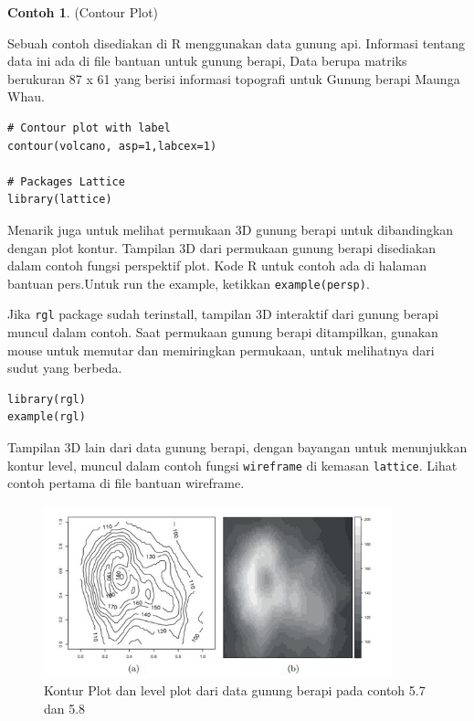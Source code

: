 \documentclass[a4paper,12pt]{article}
\theoremstyle{definition}
\newtheorem{example}{Contoh}[section]
\begin{document}
\begin{example}(Contour Plot)

Sebuah contoh disediakan di R menggunakan data gunung api. Informasi tentang data ini ada di file bantuan untuk gunung berapi, Data berupa matriks berukuran 87 x 61 yang berisi informasi topografi untuk Gunung berapi Maunga Whau.

\begin{lstlisting}
# Contour plot with label
contour(volcano, asp=1,labcex=1)

# Packages Lattice
library(lattice)
\end{lstlisting}

Menarik juga untuk melihat permukaan 3D gunung berapi untuk dibandingkan dengan plot kontur. Tampilan 3D dari permukaan gunung berapi disediakan dalam contoh fungsi perspektif plot. Kode R untuk contoh ada di halaman bantuan pers.Untuk run the example, ketikkan \texttt{example(persp)}. 

Jika \texttt{rgl} package sudah terinstall, tampilan 3D interaktif dari gunung berapi muncul dalam contoh. Saat permukaan gunung berapi ditampilkan, gunakan mouse untuk memutar dan memiringkan permukaan, untuk melihatnya dari sudut yang berbeda.

\begin{lstlisting}
library(rgl)
example(rgl)
\end{lstlisting}

Tampilan 3D lain dari data gunung berapi, dengan bayangan untuk menunjukkan kontur level, muncul dalam contoh fungsi \texttt{wireframe} di  kemasan \texttt{lattice}. Lihat contoh pertama di file bantuan wireframe.

\begin{figure}[H]
    \centering
    \includegraphics[height=5cm]{gb/K3G1.png}
    \caption{Kontur Plot dan level plot dari data
    gunung berapi pada contoh 5.7 dan 5.8}
    \label{K3G1}
\end{figure}
\end{example}
\end{document}
